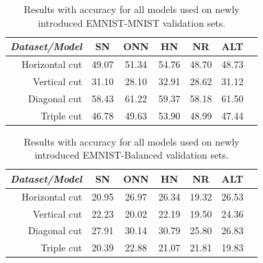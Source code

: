 \documentclass[b5paper]{book}
\begin{document}
\begin{table}[ht]
  \centering
  \begin{tabular}{rS[table-format=2.1]S[table-format=2.1]S[table-format=2.1]S[table-format=2.1]S[table-format=2.1]S[table-format=2.1]}
    \toprule
     \textit{Dataset/Model} & SN & ONN & HN & NR & ALT \\
    \midrule
    {Horizontal cut} & {49.07} & {51.34} & {54.76} & {48.70} & {48.73} \\
    {Vertical cut} & {31.10} & {28.10} & {32.91} & {28.62} & {31.12} \\
    {Diagonal cut} & {58.43} & {61.22} & {59.37} & {58.18} & {61.50} \\
    {Triple cut} & {46.78} & {49.63} & {53.90} & {48.99} & {47.44} \\
    
    \bottomrule
  \end{tabular}
  \caption{Results with accuracy for all models used on newly introduced EMNIST-MNIST validation sets.}
  \label{tab:results-emnistmnist}
\end{table} 

\begin{table}[ht]
  \centering
  \begin{tabular}{rS[table-format=2.1]S[table-format=2.1]S[table-format=2.1]S[table-format=2.1]S[table-format=2.1]S[table-format=2.1]}
    \toprule
     \textit{Dataset/Model} & SN & ONN & HN & NR & ALT \\
    \midrule
    {Horizontal cut} & {20.95} & {26.97} & {26.34} & {19.32} & {26.53} \\
    {Vertical cut} & {22.23} & {20.02} & {22.19} & {19.50} & {24.36} \\
    {Diagonal cut} & {27.91} & {30.14} & {30.79} & {25.80} & {26.83} \\
    {Triple cut} & {20.39} & {22.88} & {21.07} & {21.81} & {19.83} \\
    
    \bottomrule
  \end{tabular}
  \caption{Results with accuracy for all models used on newly introduced EMNIST-Balanced validation sets.}
  \label{tab:results-emnist}
\end{table} 
\end{document}
